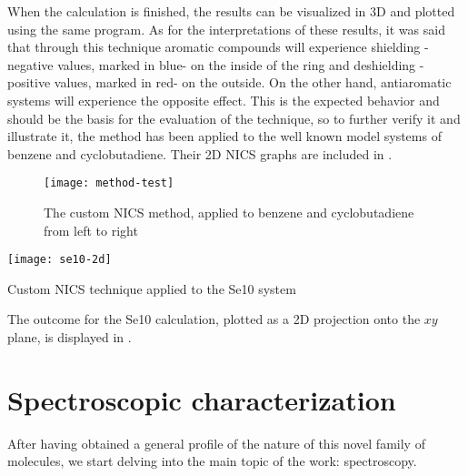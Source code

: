 When the calculation is finished, the results can be visualized in 3D and plotted using the same program.
As for the interpretations of these results, it was said that through this technique aromatic compounds will experience shielding -negative values, marked in blue- on the inside of the ring and deshielding -positive values, marked in red- on the outside.
On the other hand, antiaromatic systems will experience the opposite effect.
This is the expected behavior and should be the basis for the evaluation of the technique, so to further verify it and illustrate it, the method has been applied to the well known model systems of benzene and cyclobutadiene.
Their 2D NICS graphs are included in .

\begin{figure}[h]
    \texttt{[image: method-test]}
    \caption[NICS applied to test systems]{The custom NICS method, applied to benzene and cyclobutadiene from left to right}
\end{figure}

\begin{marginfigure}
    \texttt{[image: se10-2d]}
    \caption[NICS applied to Se10]{Custom NICS technique applied to the Se10 system}
\end{marginfigure}

The outcome for the Se10 calculation, plotted as a 2D projection onto the $xy$ plane, is displayed in .
\blindtext[2]



\section{Spectroscopic characterization}
After having obtained a general profile of the nature of this novel family of molecules, we start delving into the main topic of the work: spectroscopy.


